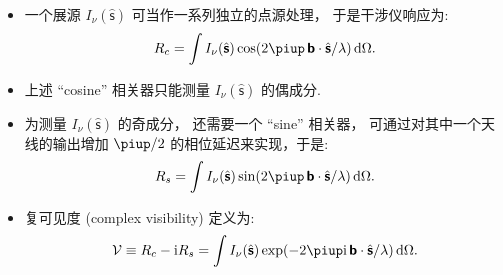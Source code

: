 \documentclass{beamer}
\newcommand{\R}[1]{\text{#1}}  %
\newcommand{\Ci}{\R{i}}  %
\newcommand{\Cpi}{\piup}  %
\newcommand{\B}[1]{\bm{\mathsf{#1}}}  %
\newcommand{\D}[1]{\R{d}#1}
\begin{document}
\begin{frame}
  \begin{itemize}
    \item 一个展源 $I_{\nu}(\hat{\B{s}})$ 可当作一系列独立的点源处理，
      于是干涉仪响应为:
      \begin{equation}
        R_c = \int I_{\nu}(\hat{\B{s}})
          \cos (2\Cpi\, \B{b} \cdot \hat{\B{s}} / \lambda) \,\D{\Omega} .
      \end{equation}
    \item 上述 \enquote{cosine} 相关器只能测量 $I_{\nu}(\hat{\B{s}})$ 的偶成分.
    \item 为测量 $I_{\nu}(\hat{\B{s}})$ 的奇成分，
      还需要一个 \enquote{sine} 相关器，
      可通过对其中一个天线的输出增加 $\Cpi/2$ 的相位延迟来实现，于是:
      \begin{equation}
        R_s = \int I_{\nu}(\hat{\B{s}})
          \sin (2\Cpi\, \B{b} \cdot \hat{\B{s}} / \lambda) \,\D{\Omega} .
      \end{equation}
    \item \alert{复可见度 (complex visibility)} 定义为:
      \begin{equation}
        \mathcal{V}
          \equiv R_c - \Ci R_s
          = \int I_{\nu}(\hat{\B{s}})
            \exp (- 2\Cpi\Ci\, \B{b} \cdot \hat{\B{s}} / \lambda)
            \,\D{\Omega} .
      \end{equation}
  \end{itemize}
\end{frame}
\end{document}
